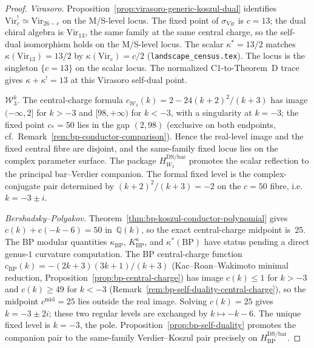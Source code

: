 \begin{proof}
\emph{Virasoro.} Proposition~\ref{prop:virasoro-generic-koszul-dual}
identifies $\mathrm{Vir}_c^! \simeq \mathrm{Vir}_{26-c}$ on the
M/S-level locus. The fixed point of $\sigma_{\mathrm{Vir}}$ is
$c = 13$; the dual chiral algebra is $\mathrm{Vir}_{13}$, the same
family at the same central charge, so the self-dual isomorphism
holds on the M/S-level locus. The scalar
$\kappa^* = 13/2$ matches
$\kappa(\mathrm{Vir}_{13}) = 13/2$ by
$\kappa(\mathrm{Vir}_c) = c/2$
\textup{(}\texttt{landscape\_census.tex}\textup{)}. The locus is the
singleton $\{c = 13\}$ on the scalar locus.  The normalized
C1-to-Theorem~D trace gives
$\kappa+\kappa^!=13$ at this Virasoro self-dual point.

\emph{$\mathcal{W}_3^k$.} The central-charge formula
$c_{\mathcal{W}_3}(k) = 2 - 24(k+2)^2/(k+3)$ has image
$(-\infty, 2]$ for $k > -3$ and $[98, +\infty)$ for $k < -3$, with
a singularity at $k = -3$; the fixed point $c_* = 50$ lies in the
gap $(2, 98)$ \textup{(}exclusive on both endpoints, cf.\
Remark~\ref{rem:bp-conductor-comparison}\textup{)}.  Hence the
real-level image and the fixed central fibre are disjoint, and the
same-family fixed locus lies on the complex parameter surface.  The package
$H_{W_3}^{\mathrm{DS/bar}}$ promotes the scalar reflection to the
principal bar--Verdier companion.  The formal fixed level is
the complex-conjugate pair determined by
$(k+2)^2/(k+3) = -2$ on the $c = 50$ fibre, i.e.\
$k = -3 \pm i$.

\emph{Bershadsky--Polyakov.}
Theorem~\ref{thm:bp-koszul-conductor-polynomial} gives
$c(k)+c(-k-6)=50$ in~$\mathbb Q(k)$,
so the exact central-charge midpoint is~$25$.  The BP modular
quantities $\kappa_{\mathrm{BP}}$, $K^\kappa_{\mathrm{BP}}$, and
$\kappa^*(\mathrm{BP})$ have status \ClaimStatusOpen pending a direct
genus-$1$ curvature computation.  The BP central-charge function
$c_{\mathrm{BP}}(k) = -(2k+3)(3k+1)/(k+3)$
\textup{(}Kac--Roan--Wakimoto minimal reduction,
Proposition~\ref{prop:bp-central-charge}\textup{)}
has image
$c(k) \leq 1$ for $k > -3$ and $c(k) \geq 49$ for $k < -3$
\textup{(}Remark~\ref{rem:bp-self-duality-central-charge}\textup{)},
so the midpoint $c^{\mathrm{mid}}=25$ lies outside the real image.
Solving $c(k)=25$ gives $k=-3\pm2i$; these two regular levels are
exchanged by $k\mapsto-k-6$.  The unique fixed level is $k=-3$, the
pole.  Proposition~\ref{prop:bp-self-duality} promotes the companion
pair to the same-family Verdier--Koszul pair precisely on
$H_{\mathrm{BP}}^{\mathrm{DS/bar}}$.


\end{proof}
